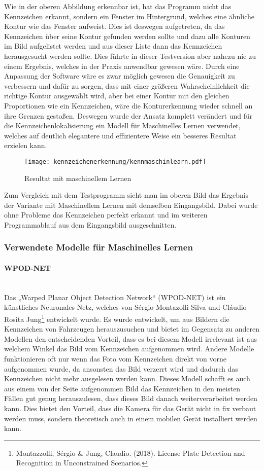 Wie in der oberen Abbildung erkennbar ist, hat das Programm nicht das Kennzeichen erkannt, sondern ein Fenster im Hintergrund, welches eine ähnliche Kontur 
wie das Fenster aufweist. Dies ist deswegen aufgetreten, da das Kennzeichen über seine Kontur gefunden werden sollte und dazu alle Konturen im Bild aufgelistet 
werden und aus dieser Liste dann das Kennzeichen herausgesucht werden sollte. Dies führte in dieser Testversion aber nahezu nie zu einem Ergebnis, welches in 
der Praxis anwendbar gewesen wäre. Durch eine Anpassung der Software wäre es zwar möglich gewesen die Genauigkeit zu verbessern und dafür zu sorgen, dass mit 
einer größeren Wahrscheinlichkeit die richtige Kontur ausgewählt wird, aber bei einer Kontur mit den gleichen Proportionen wie ein Kennzeichen, wäre die Konturerkennung 
wieder schnell an ihre Grenzen gestoßen. Deswegen wurde der Ansatz komplett verändert und für die Kennzeichenlokalisierung ein Modell für Maschinelles Lernen 
verwendet, welches auf deutlich elegantere und effizientere Weise ein besseres Resultat erzielen kann.

\begin{figure}[H]
    \centering
    \texttt{[image: kennzeichenerkennung/kennmaschinlearn.pdf]}
    \caption{Resultat mit maschinellem Lernen}
\end{figure}

Zum Vergleich mit dem Testprogramm sieht man im oberen Bild das Ergebnis der Variante mit Maschinellem Lernen mit demselben Eingangsbild. Dabei wurde ohne 
Probleme das Kennzeichen perfekt erkannt und im weiteren Programmablauf aus dem Eingangsbild ausgeschnitten.

\subsubsection{Verwendete Modelle für Maschinelles Lernen}

\paragraph{WPOD-NET}\mbox{}\\
Das „Warped Planar Object Detection Network“ (WPOD-NET) ist ein künstliches Neuronales Netz, welches von Sérgio Montazolli Silva und 
Cláudio Rosita Jung\footnote{Montazzolli, Sérgio \& Jung, Claudio. (2018). License Plate Detection and Recognition in Unconstrained Scenarios. } 
entwickelt wurde. Es wurde entwickelt, um aus Bildern die Kennzeichen von Fahrzeugen herauszusuchen und bietet im Gegensatz zu anderen Modellen den entscheidenden 
Vorteil, dass es bei diesem Modell irrelevant ist aus welchem Winkel das Bild vom Kennzeichen aufgenommen wird. Andere Modelle funktionieren oft nur wenn das Foto 
vom Kennzeichen direkt von vorne aufgenommen wurde, da ansonsten das Bild verzerrt wird und dadurch das Kennzeichen nicht mehr ausgelesen werden kann. Dieses Modell 
schafft es auch aus einem von der Seite aufgenommen Bild das Kennzeichen in den meisten Fällen gut genug herauszulesen, dass dieses Bild danach weiterverarbeitet 
werden kann. Dies bietet den Vorteil, dass die Kamera für das Gerät nicht in fix verbaut werden muss, sondern theoretisch auch in einem mobilen Gerät installiert werden kann.\\

